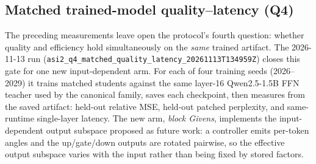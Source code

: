 \begin{table}[t]
\centering\small
\caption{Complete-FFN five-arm latency sweep (2026-11-12, same host as
the hardened 2026-11-08 re-run;
Ascend~910B2, $d{=}4096$, $m{=}14336$, $r{=}128$, fp16), emitted by the
audit script from the archived sweep record. Medians over 5 repeats of
200 synchronized host-timed iterations. All four numerical validations
(dense-vs-persistent factorization, materialized-vs-fused,
materialized-vs-fused\_v4, fused-vs-fused\_v4) pass at every geometry;
the last is an exact fp16 match (max abs $0.0$). The final column is
the v1-over-v4 fused ratio; values above 1.0 favor the multicore v4
kernel. Kernel-level HBM/L2 counter evidence for v4 is reported
separately and is not part of this sweep.}
\label{tab:completeffn}

\end{table}

\subsection{Matched trained-model quality--latency (Q4)}\label{sec:matched-q4}
The preceding measurements leave open the protocol's fourth question: whether
quality and efficiency hold simultaneously on the \emph{same} trained
artifact. The 2026-11-13 run
(\texttt{asi2\_q4\_matched\_quality\_latency\_20261113T134959Z}) closes this
gate for one new input-dependent arm. For each of four training seeds
(2026--2029) it trains matched students against the same layer-16 Qwen2.5-1.5B
FFN teacher used by the canonical family, saves each checkpoint, then measures
from the saved artifact: held-out relative MSE, held-out patched perplexity,
and same-runtime single-layer latency. The new arm, \emph{block Givens},
implements the input-dependent output subspace proposed as future work: a
controller emits per-token angles and the up/gate/down outputs are rotated
pairwise, so the effective output subspace varies with the input rather than
being fixed by stored factors.

